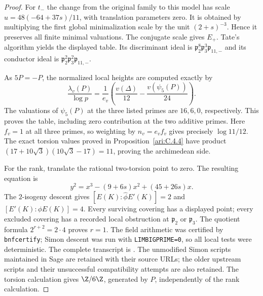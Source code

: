 \begin{proof}
For $t_-$ the change from the original family to this model
has scale $u=48(-64+37s)/11$, with translation parameters zero.
It is obtained by multiplying the first global minimalization
scale by the unit $(2+s)^{-3}$. Hence it preserves all finite
minimal valuations. The conjugate scale gives $E_+$.
Tate's algorithm yields the displayed table. Its discriminant
ideal is
$\mathfrak p_2^8\mathfrak p_3^3\mathfrak p_{11,-}$ and its
conductor ideal is
$\mathfrak p_2^2\mathfrak p_3^2\mathfrak p_{11,-}$.

As $5P=-P$, the normalized local heights are computed exactly by
\[
 \frac{\lambda_v(P)}{\log p}
 =\frac1{e_v}\left(\frac{v(\Delta)}{12}
                         -\frac{v(\psi_5(P))}{24}\right).
\]
The valuations of $\psi_5(P)$ at the three listed primes are
$16,6,0$, respectively. This proves the table, including zero
contribution at the two additive primes. Here $f_v=1$ at all
three primes, so weighting by $n_v=e_vf_v$ gives precisely
$\log11/12$. The exact torsion values proved in Proposition~\ref{ari:C.4.4} have product
$(17+10\sqrt3)(10\sqrt3-17)=11$, proving the archimedean side.

For the rank, translate the rational two-torsion point to zero.
The resulting equation is
\[
 y^2=x^3-(9+6s)x^2+(45+26s)x.
\]
The $2$-isogeny descent gives
$[E(K):\widehat\phi E'(K)]=2$ and
$[E'(K):\phi E(K)]=4$. Every surviving covering has a
displayed point; every excluded covering has a recorded local
obstruction at $\mathfrak p_2$ or $\mathfrak p_3$.
The quotient formula $2^{r+2}=2\cdot4$ proves $r=1$.
The field arithmetic was certified by \texttt{bnfcertify};
Simon descent was run with \texttt{LIMBIGPRIME=0}, so all local
tests were deterministic. The complete transcript is
. The unmodified
Simon scripts maintained in Sage are retained with their source
URLs; the older upstream scripts and their unsuccessful
compatibility attempts are also retained. The torsion calculation
gives $\Z/6\Z$, generated by $P$, independently of the rank
calculation.
\end{proof}

